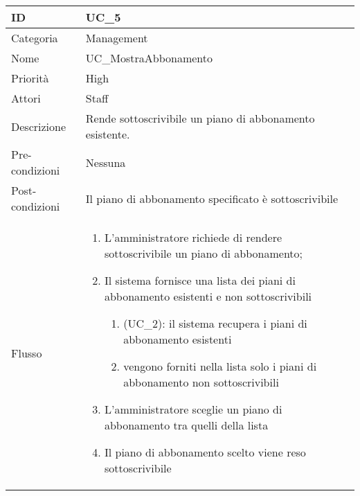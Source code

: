 \begin{center}
\begin{tabular}{ |p{2cm}|p{13cm}|  }
\hline
ID & UC\_5 \\\hline
Categoria & Management\\\hline
Nome & UC\_MostraAbbonamento\\\hline
Priorità & High \\\hline
Attori &  Staff \\\hline
Descrizione & Rende sottoscrivibile un piano di abbonamento esistente.\\\hline
Pre-condizioni &  Nessuna \\\hline
Post-condizioni &  Il piano di abbonamento specificato è sottoscrivibile\\\hline
Flusso &  	\begin{enumerate}
		\item L'amministratore richiede di rendere sottoscrivibile un piano di abbonamento;
		\item Il sistema fornisce una lista dei piani di abbonamento esistenti e non sottoscrivibili
			\begin{enumerate}[  ]
			\item (UC\_2): il sistema recupera i piani di abbonamento esistenti
			\item vengono forniti nella lista solo i piani di abbonamento non sottoscrivibili
			\end{enumerate}
		\item L'amministratore sceglie un piano di abbonamento tra quelli della lista
		\item Il piano di abbonamento scelto viene reso sottoscrivibile
		\end{enumerate}\\\hline
\end{tabular}
\label{table_use_case:5}\newline



\end{center}
